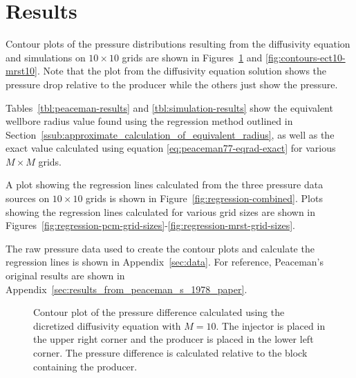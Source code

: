 
\section{Results} %
\label{sec:results}
Contour plots of the pressure distributions resulting from the diffusivity equation and simulations on $10\times 10$ grids are shown in Figures~\ref{fig:pressure_drop_contour} and \ref{fig:contours-ect10-mrst10}. Note that the plot from the diffusivity equation solution shows the pressure drop relative to the producer while the others just show the pressure.

Tables~\ref{tbl:peaceman-results} and \ref{tbl:simulation-results} show the equivalent wellbore radius value found using the regression method outlined in Section~\ref{ssub:approximate_calculation_of_equivalent_radius}, as well as the exact value calculated using equation \eqref{eq:peaceman77-eqrad-exact} for various $M\times M$ grids.

A plot showing the regression lines calculated from the three pressure data sources on $10\times 10$ grids is shown in Figure~\ref{fig:regression-combined}. Plots showing the regression lines calculated for various grid sizes are shown in Figures~\ref{fig:regression-pcm-grid-sizes}-\ref{fig:regression-mrst-grid-sizes}.

The raw pressure data used to create the contour plots and calculate the regression lines is shown in Appendix~\ref{sec:data}. For reference, Peaceman's original results are shown in Appendix~\ref{sec:results_from_peaceman_s_1978_paper}.

\begin{figure}[htbp]
    \centering
    \scalebox{0.52}{}
    \caption{Contour plot of the pressure difference calculated using the dicretized diffusivity equation with $M=10$. The injector is placed in the upper right corner and the producer is placed in the lower left corner. The pressure difference is calculated relative to the block containing the producer.}
    \label{fig:pressure_drop_contour}
\end{figure}

